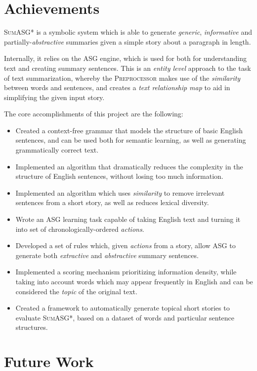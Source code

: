\section{Achievements}

\textsc{SumASG*} is a symbolic system which is able to generate \textit{generic}, \textit{informative} and partially-\textit{abstractive} summaries given a simple story about a paragraph in length.

Internally, it relies on the ASG engine, which is used for both for understanding text and creating summary sentences. This is an \textit{entity level} approach to the task of text summarization, whereby the \textsc{Preprocessor} makes use of the \textit{similarity} between words and sentences, and creates a \textit{text relationship map} to aid in simplifying the given input story.

The core accomplishments of this project are the following:

\begin{itemize}
\item Created a context-free grammar that models the structure of basic English sentences, and can be used both for semantic learning, as well as generating grammatically correct text.
\item Implemented an algorithm that dramatically reduces the complexity in the structure of English sentences, without losing too much information.
\item Implemented an algorithm which uses \textit{similarity} to remove irrelevant sentences from a short story, as well as reduces lexical diversity.
\item Wrote an ASG learning task capable of taking English text and turning it into set of chronologically-ordered \textit{actions}.
\item Developed a set of rules which, given \textit{actions} from a story, allow ASG to generate both \textit{extractive} and \textit{abstractive} summary sentences.
\item Implemented a scoring mechanism prioritizing information density, while taking into account words which may appear frequently in English and can be considered the \textit{topic} of the original text.
\item Created a framework to automatically generate topical short stories to evaluate \textsc{SumASG*}, based on a dataset of words and particular sentence structures.
\end{itemize}

\section{Future Work}

